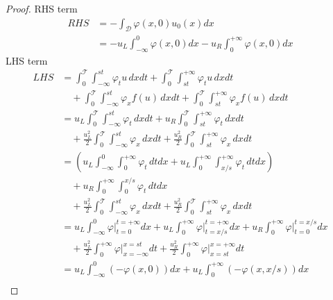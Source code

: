 \documentclass[12pt]{article}
\begin{document}
\begin{proof}
	RHS term
	\begin{align*}
		RHS & = -\int_{\mathscr{D}}\varphi(x,0)u_{0}(x)dx \\
		    & = -u_{L}\int_{-\infty}^{0}\varphi(x,0)dx 
		-u_{R}\int^{+\infty}_{0}\varphi(x,0)dx
	\end{align*}
	LHS term
	\begin{align*}
		LHS 
		 & = 
		\int_{0}^{\mathscr{T}}\int_{-\infty}^{st}\varphi_{t}u\,dxdt
		+\int_{0}^{\mathscr{T}}\int_{st}^{+\infty}\varphi_{t}u\,dxdt                            \\
		 & \quad +\int_{0}^{\mathscr{T}}\int_{-\infty}^{st}\varphi_{x}f(u)\,dxdt
		+\int_{0}^{\mathscr{T}}\int_{st}^{+\infty}\varphi_{x}f(u)\,dxdt                         \\
		 & =
		u_{L}\int_{0}^{\mathscr{T}}\int_{-\infty}^{st}\varphi_{t}\,dxdt
		+u_{R}\int_{0}^{\mathscr{T}}\int_{st}^{+\infty}\varphi_{t}\,dxdt                        \\
		 & \quad + \frac{u_{L}^2}{2}\int_{0}^{\mathscr{T}}\int_{-\infty}^{st}\varphi_{x}\,dxdt
		+\frac{u_{R}^2}{2}\int_{0}^{\mathscr{T}}\int_{st}^{+\infty}\varphi_{x}\,dxdt            \\
		 & =
		\left(
		u_{L}\int_{-\infty}^{0}\int_{0}^{+\infty}\varphi_{t}\,dtdx
		+u_{L}\int_{0}^{+\infty}\int_{x/s}^{+\infty}\varphi_{t}\,dtdx
		\right)                                                                                 \\
		 & \quad +u_{R}\int_{0}^{+\infty}\int_{0}^{x/s}\varphi_{t}\,dtdx                        \\
		 & \quad + \frac{u_{L}^2}{2}\int_{0}^{\mathscr{T}}\int_{-\infty}^{st}\varphi_{x}\,dxdt
		+ \frac{u_{R}^2}{2}\int_{0}^{\mathscr{T}}\int_{st}^{+\infty}\varphi_{x}\,dxdt           \\
		 & =      
		u_{L}\int_{-\infty}^{0} \left. \varphi\right|_{t=0}^{t=+\infty}dx
		+u_{L}\int_{0}^{+\infty} \left. \varphi\right|_{t=x/s}^{t=+\infty}dx
		+u_{R}\int_{0}^{+\infty} \left. \varphi\right|_{t=0}^{t=x/s}dx                          \\
		 & \quad +\frac{u_{L}^2}{2}\int_{0}^{+\infty}\left. \varphi\right|_{x=-\infty}^{x=st}dt
		+\frac{u_{R}^2}{2}\int_{0}^{+\infty}\left. \varphi\right|_{x=st}^{x=+\infty}dt          \\
		 & =
		u_{L}\int_{-\infty}^{0} \left(-\varphi(x,0)\right) dx 
		+ u_{L}\int_{0}^{+\infty} \left(-\varphi(x,x/s)\right) dx                               \\

\end{align*}
\end{proof}
\end{document}
